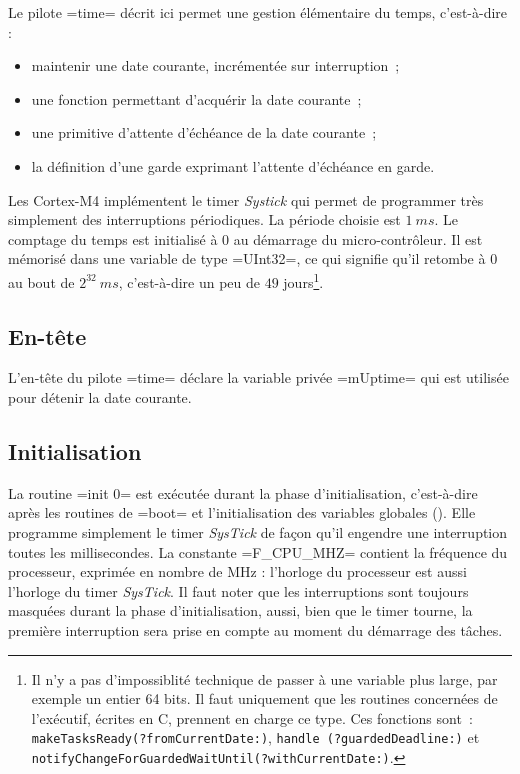 
Le pilote \omnibus=time= décrit ici permet une gestion élémentaire du temps, c'est-à-dire :
\begin{itemize}
  \item maintenir une date courante, incrémentée sur interruption~;
  \item une fonction permettant d'acquérir la date courante~;
  \item une primitive d'attente d'échéance de la date courante~;
  \item la définition d'une garde exprimant l'attente d'échéance en garde.
\end{itemize}

Les Cortex-M4 implémentent le timer \emph{Systick} qui permet de programmer très simplement des interruptions périodiques. La période choisie est $1~ms$. Le comptage du temps est initialisé à $0$ au démarrage du micro-contrôleur. Il est mémorisé dans une variable de type \omnibus=UInt32=, ce qui signifie qu'il retombe à $0$ au bout de $2^{32}~ms$, c'est-à-dire un peu de $49$ jours\footnote{Il n'y a pas d'impossiblité technique de passer à une variable plus large, par exemple un entier 64 bits. Il faut uniquement que les routines concernées de l'exécutif, écrites en C, prennent en charge ce type. Ces fonctions sont~: \texttt{makeTasksReady(?fromCurrentDate{}:)}, \texttt{handle (?guardedDeadline{}:)} et \texttt{notifyChangeForGuardedWaitUntil(?withCurrentDate{}:)}.}.



\subsection{En-tête}

L'en-tête du pilote \omnibus=time= déclare la variable privée \omnibus=mUptime= qui est utilisée pour détenir la date courante.

\begin{OMNIBUS}
driver time {
  var mUptime UInt32 = 0
\end{OMNIBUS}



\subsection{Initialisation}

La routine \omnibus=init 0= est exécutée durant la phase d'initialisation, c'est-à-dire après les routines de \omnibus=boot= et l'initialisation des variables globales (). Elle programme simplement le timer \emph{SysTick} de façon qu'il engendre une interruption toutes les millisecondes. La constante \omnibus=F_CPU_MHZ= contient la fréquence du processeur, exprimée en nombre de MHz : l'horloge du processeur est aussi l'horloge du timer \emph{SysTick}. Il faut noter que les interruptions sont toujours masquées durant la phase d'initialisation, aussi, bien que le timer tourne, la première interruption sera prise en compte au moment du démarrage des tâches.


